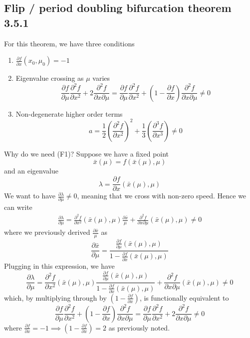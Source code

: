 \documentclass{article}
\begin{document}
\subsection{Flip / period doubling bifurcation theorem 3.5.1}

For this theorem, we have three conditions 
\begin{enumerate}
    \item[F0)] $\frac{\partial f}{\partial x}(x_0, \mu_0)=-1$ 
    \item[F1)] Eigenvalue crossing as $\mu$ varies \[ \frac{\partial f}{\partial \mu}\frac{\partial^2 f}{\partial x^2} + 2 \frac{\partial^2 f}{\partial x \partial \mu}=\frac{\partial f}{\partial \mu}\frac{\partial^2 f}{\partial x^2} + \left(1- \frac{\partial f}{\partial x}\right)\frac{\partial^2 f}{\partial x \partial \mu}\neq 0 \]
    \item[F2)] Non-degenerate higher order terms \[ a=\frac{1}{2}\left(\frac{\partial^2 f}{\partial x^2}\right)^2 + \frac{1}{3}\left(\frac{\partial^3 f}{\partial x^3}\right)\neq 0 \]
\end{enumerate}
Why do we need (F1)? Suppose we have a fixed point
\[
\bar{x}(\mu) = f(\bar{x}(\mu),\mu)
\]
and an eigenvalue 
\[
\lambda = \frac{\partial f}{\partial x}(\bar{x}(\mu),\mu)
\]
We want to have $\frac{\partial \lambda}{\partial \mu}\neq 0$, meaning that we cross with non-zero speed. Hence we can write 
\begin{gather*}
    \frac{\partial \lambda}{\partial \mu} = \frac{\partial^2 f}{\partial x^2}\left(\bar{x}(\mu),\mu\right)\frac{\partial \bar{x}}{\mu} + \frac{\partial^2 f}{\partial x \partial \mu}\left(\bar{x}(\mu),\mu\right)\neq 0
\end{gather*}
where we previously derived $\frac{\partial \bar{x}}{\mu}$ as 
\[
\frac{\partial \bar{x}}{\partial \mu} = \frac{\frac{\partial f}{\partial \mu}(\bar{x}(\mu), \mu)}{1 - \frac{\partial f}{\partial x}(\bar{x}(\mu), \mu)}
\]
Plugging in this expression, we have 
\[
\frac{\partial \lambda}{\partial \mu} = \frac{\partial^2 f}{\partial x^2}\left(\bar{x}(\mu),\mu\right)\frac{\frac{\partial f}{\partial \mu}(\bar{x}(\mu), \mu)}{1 - \frac{\partial f}{\partial x}(\bar{x}(\mu), \mu)}+ \frac{\partial^2 f}{\partial x \partial \mu}\left(\bar{x}(\mu),\mu\right)\neq 0
\]
which, by multiplying through by $\left(1-\frac{\partial f}{\partial x}\right)$, is functionally equivalent to 
\[
\frac{\partial f}{\partial \mu}\frac{\partial^2 f}{\partial x^2} + \left(1- \frac{\partial f}{\partial x}\right)\frac{\partial^2 f}{\partial x \partial \mu}=\frac{\partial f}{\partial \mu}\frac{\partial^2 f}{\partial x^2} + 2 \frac{\partial^2 f}{\partial x \partial \mu}\neq 0 
\]
where $\frac{\partial f}{\partial x}=-1\implies \left(1-\frac{\partial f}{\partial x}\right)=2$ as previously noted.
\end{document}
